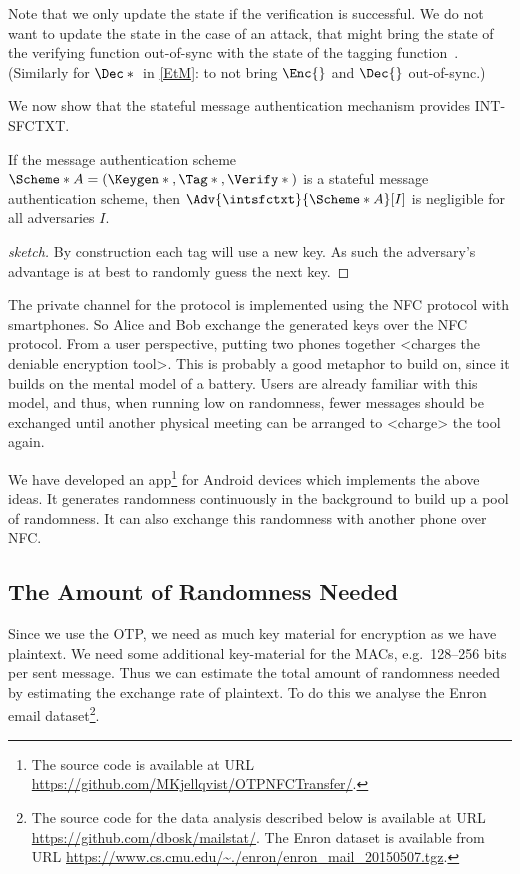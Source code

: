 Note that we only update the state if the verification is successful.
We do not want to update the state in the case of an attack, that might bring 
the state of the verifying function out-of-sync with the state of the tagging 
function~\cite{StatefulDecryption}.
(Similarly for \(\Dec*{}\) in \cref{EtM}: to not bring \(\Enc{}\) and 
\(\Dec{}\) out-of-sync.)

We now show that the stateful message authentication mechanism provides 
\ac{INT-SFCTXT}.

\begin{theorem}
  If the message authentication scheme \(\Scheme*{A} = (\Keygen*{}, \Tag*{}, 
    \Verify*{})\) is a stateful message authentication scheme,
  then \(\Adv{\intsfctxt}{\Scheme*{A}}[I]\) is negligible for all adversaries 
  \(I\).
\end{theorem}
\begin{proof}[sketch]
  By construction each tag will use a new key.
  As such the adversary's advantage is at best to randomly guess the next key.
\end{proof}

The private channel for the protocol is implemented using the \ac{NFC} protocol 
with smartphones.
So Alice and Bob exchange the generated keys over the \ac{NFC} protocol.
From a user perspective, putting two phones together <charges the deniable 
encryption tool>.
This is probably a good metaphor to build on, since it builds on the mental 
model of a battery.
Users are already familiar with this model, and thus, when running low on 
randomness, fewer messages should be exchanged until another physical meeting 
can be arranged to <charge> the tool again.

We have developed an app\footnote{%
  The source code is available at URL 
  \url{https://github.com/MKjellqvist/OTPNFCTransfer/}.
} for Android devices which implements the above ideas.
It generates randomness continuously in the background to build up a pool of 
randomness.
It can also exchange this randomness with another phone over \ac{NFC}.

\subsection{The Amount of Randomness Needed}
\label{NeededRandomness}
Since we use the \ac{OTP}, we need as much key material for encryption as we 
have plaintext.
We need some additional key-material for the \acp{MAC}, e.g.~128--256 bits 
per sent message.
Thus we can estimate the total amount of randomness needed by estimating the 
exchange rate of plaintext.
To do this we analyse the Enron email dataset\footnote{%
  The source code for the data analysis described below is available at URL 
  \url{https://github.com/dbosk/mailstat/}.
  The Enron dataset is available from URL 
  \url{https://www.cs.cmu.edu/~./enron/enron_mail_20150507.tgz}.
}.

